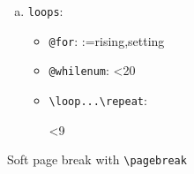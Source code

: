 \begin{enumerate}[(a)]
		\item \verb|loops|:
		
		\begin{itemize}
			\item \verb|@for|:
			\makeatletter
			\@for\sun:={rising,setting}
			\makeatother
			
			
			
			\item \verb|@whilenum|:
			\setcounter{int}{0}
			\makeatletter
			\@whilenum\value{int}<20
			\makeatother
			
			\item \verb|\loop...\repeat|:
			\setcounter{int}{1}
			\loop
			\theint
			\text{ }\addtocounter{int}{1}\quad\ifnum\value{int}<9
			\repeat
		\end{itemize}
		
	\end{enumerate}
	
	Soft page break with \verb*|\pagebreak|
	\pagebreak
	
